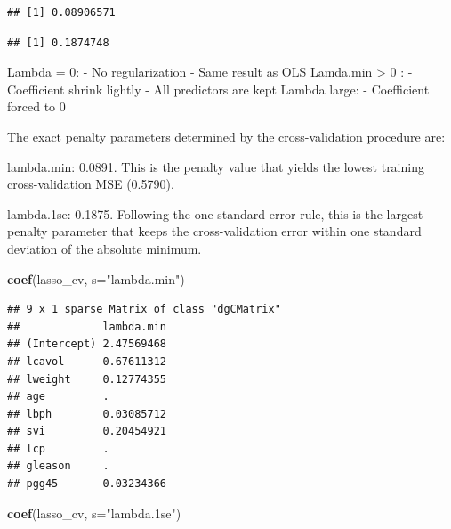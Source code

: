 \documentclass[
]{article}
\newenvironment{Shaded}{\begin{snugshade}}{\end{snugshade}}
\newcommand{\AttributeTok}[1]{\textcolor[rgb]{0.13,0.29,0.53}{#1}}
\newcommand{\FloatTok}[1]{\textcolor[rgb]{0.00,0.00,0.81}{#1}}
\newcommand{\FunctionTok}[1]{\textcolor[rgb]{0.13,0.29,0.53}{\textbf{#1}}}
\newcommand{\NormalTok}[1]{#1}
\newcommand{\SpecialCharTok}[1]{\textcolor[rgb]{0.81,0.36,0.00}{\textbf{#1}}}
\newcommand{\StringTok}[1]{\textcolor[rgb]{0.31,0.60,0.02}{#1}}
\begin{document}
\begin{verbatim}
## [1] 0.08906571
\end{verbatim}

\begin{Shaded}
\end{Shaded}

\begin{verbatim}
## [1] 0.1874748
\end{verbatim}

Lambda = 0: - No regularization - Same result as OLS Lamda.min
\textgreater{} 0 : - Coefficient shrink lightly - All predictors are
kept Lambda large: - Coefficient forced to 0

The exact penalty parameters determined by the cross-validation
procedure are:

lambda.min: 0.0891. This is the penalty value that yields the lowest
training cross-validation MSE (0.5790).

lambda.1se: 0.1875. Following the one-standard-error rule, this is the
largest penalty parameter that keeps the cross-validation error within
one standard deviation of the absolute minimum.

\begin{Shaded}
\begin{Highlighting}[]
\FunctionTok{coef}\NormalTok{(lasso\_cv, }\AttributeTok{s=}\StringTok{"lambda.min"}\NormalTok{)}
\end{Highlighting}
\end{Shaded}

\begin{verbatim}
## 9 x 1 sparse Matrix of class "dgCMatrix"
##             lambda.min
## (Intercept) 2.47569468
## lcavol      0.67611312
## lweight     0.12774355
## age         .         
## lbph        0.03085712
## svi         0.20454921
## lcp         .         
## gleason     .         
## pgg45       0.03234366
\end{verbatim}

\begin{Shaded}
\begin{Highlighting}[]
\FunctionTok{coef}\NormalTok{(lasso\_cv, }\AttributeTok{s=}\StringTok{"lambda.1se"}\NormalTok{)}
\end{Highlighting}
\end{Shaded}
\end{document}
